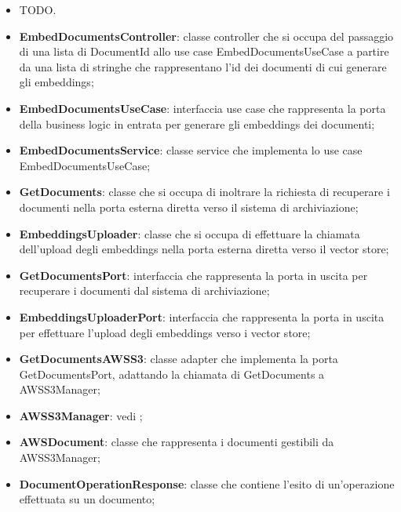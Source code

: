 \documentclass[10pt, a4paper]{article}
\begin{document}
\begin{itemize}
    \item TODO.
\end{itemize}

\begin{itemize}
    \item \label{EmbedDocumentsController}\textbf{EmbedDocumentsController}: classe controller che si occupa del passaggio di una lista di DocumentId allo use case EmbedDocumentsUseCase a partire da una lista di stringhe che rappresentano l'id dei documenti di cui generare gli embeddings;
    \item \label{EmbedDocumentsUseCase}\textbf{EmbedDocumentsUseCase}: interfaccia use case che rappresenta la porta della business logic in entrata per generare gli embeddings dei documenti;
    \item \label{EmbedDocumentsService}\textbf{EmbedDocumentsService}: classe service che implementa lo use case EmbedDocumentsUseCase;
    \item \label{GetDocuments}\textbf{GetDocuments}: classe che si occupa di inoltrare la richiesta di recuperare i documenti nella porta esterna diretta verso il sistema di archiviazione;
    \item \label{EmbeddingsUploader}\textbf{EmbeddingsUploader}: classe che si occupa di effettuare la chiamata dell'upload degli embeddings nella porta esterna diretta verso il vector store;
    \item \label{GetDocumentsPort}\textbf{GetDocumentsPort}: interfaccia che rappresenta la porta in uscita per recuperare i documenti dal sistema di archiviazione;
    \item \label{EmbeddingsUploaderPort}\textbf{EmbeddingsUploaderPort}: interfaccia che rappresenta la porta in uscita per effettuare l'upload degli embeddings verso i vector store;
    \item \label{GetDocumentsAWSS3}\textbf{GetDocumentsAWSS3}: classe adapter che implementa la porta GetDocumentsPort, adattando la chiamata di GetDocuments a AWSS3Manager;
    \item \textbf{AWSS3Manager}: vedi ;
    \item \label{AWSDocument}\textbf{AWSDocument}: classe che rappresenta i documenti gestibili da AWSS3Manager;
    \item \label{DocumentOperationResponse}\textbf{DocumentOperationResponse}: classe che contiene l'esito di un'operazione effettuata su un documento;

\end{itemize}
\end{document}
